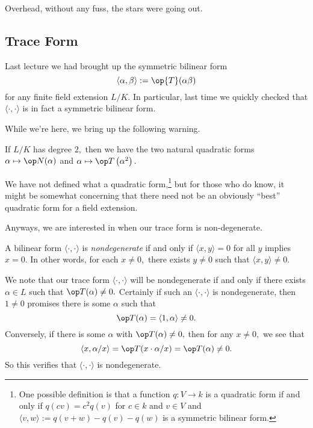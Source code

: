 \documentclass[../notes.tex]{subfiles}
\begin{document}












Overhead, without any fuss, the stars were going out.

\subsection{Trace Form}
Last lecture we had brought up the symmetric bilinear form
\[\langle\alpha,\beta\rangle:=\op{T}(\alpha\beta)\]
for any finite field extension $L/K.$ In particular, last time we quickly checked that $\langle\cdot,\cdot\rangle$ is in fact a symmetric bilinear form.

While we're here, we bring up the following warning.
\begin{warn}
	If $L/K$ has degree $2,$ then we have the two natural quadratic forms $\alpha\mapsto\op N(\alpha)$ and $\alpha\mapsto\op T\left(\alpha^2\right).$
\end{warn}
We have not defined what a quadratic form,\footnote{One possible definition is that a function $q:V\to k$ is a quadratic form if and only if $q(cv)=c^2q(v)$ for $c\in k$ and $v\in V$ and $\langle v,w\rangle:=q(v+w)-q(v)-q(w)$ is a symmetric bilinear form.} but for those who do know, it might be somewhat concerning that there need not be an obviously ``best'' quadratic form for a field extension.

Anyways, we are interested in when our trace form is non-degenerate.
\begin{definition}[Nondegenerate]
	A bilinear form $\langle\cdot,\cdot\rangle$ is \textit{nondegenerate} if and only if $\langle x,y\rangle=0$ for all $y$ implies $x=0.$ In other words, for each $x\ne0,$ there exists $y\ne0$ such that $\langle x,y\rangle\ne0.$
\end{definition}
We note that our trace form $\langle\cdot,\cdot\rangle$ will be nondegenerate if and only if there exists $\alpha\in L$ such that $\op T(\alpha)\ne0.$ Certainly if such an $\langle\cdot,\cdot\rangle$ is nondegenerate, then $1\ne0$ promises there is some $\alpha$ such that
\[\op T(\alpha)=\langle1,\alpha\rangle\ne0.\]
Conversely, if there is some $\alpha$ with $\op T(\alpha)\ne0,$ then for any $x\ne0,$ we see that
\[\langle x,\alpha/x\rangle=\op T(x\cdot\alpha/x)=\op T(\alpha)\ne0.\]
So this verifies that $\langle\cdot,\cdot\rangle$ is nondegenerate.
\end{document}
